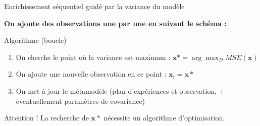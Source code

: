 \begin{frame}{Enrichissement séquentiel guidé par la variance du modèle}

\textbf{On ajoute des observations une par une en suivant le schéma :}

\begin{block}{Algorithme (boucle)}

\begin{enumerate}
	\item On cherche le point où la variance est maximum : $\mathbf{x}* = \arg \max_D MSE (\mathbf{x})$
	\item On ajoute une nouvelle observation en ce point : $\mathbf{x}_i = \mathbf{x}*$
	\item On met à jour le métamodèle (plan d'expériences et observation, + éventuellement paramètres de covariance)
\end{enumerate}
\end{block}

\begin{alertblock}{Attention !}
 La recherche de $\mathbf{x}*$ nécessite un algorithme d'optimisation.
\end{alertblock}

\end{frame}
